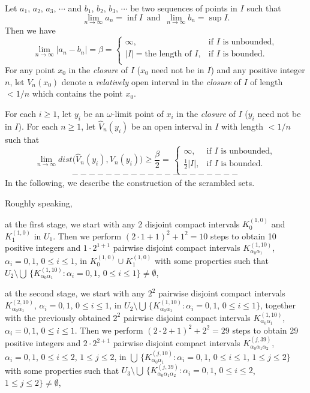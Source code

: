 \documentclass[12pt]{article}
\newcommand{\al}{\alpha}
\begin{document}
Let $a_1$, $a_2$, $a_3$, $\cdots$ and $b_1$, $b_2$, $b_3$, $\cdots$ be two sequences of points in $I$ such that
$$
\lim_{n \to \infty} a_n = \inf I \,\,\, \text{and} \,\,\, \lim_{n \to \infty} b_n = \sup I.
$$
Then we have
$$
\lim_{n \to \infty} |a_n - b_n| = \beta = \begin{cases}
         \infty, & \text{if $I$ is unbounded}, \\
         |I| = \text{the length of $I$}, & \text{if $I$ is bounded}. \\
         \end{cases}
$$ 
\indent For any point $x_0$ in the {\it closure} of $I$ ($x_0$ need not be in $I$) and any positive integer $n$, let $V_n(x_0)$ denote a {\it relatively} open interval in the {\it closure} of $I$ of length $< 1/n$ which contains the point $x_0$.
 
For each $i \ge 1$, let $y_i$ be an $\omega$-limit point of $x_i$ in the {\it closure} of $I$ ($y_i$ need not be in $I$).  For each $n \ge 1$, let $\widehat V_n(y_i)$ be an open interval in $I$ with length $< 1/n$ such that 
$$
\lim_{n \to \infty} dist\big(\widehat V_n(y_i), V_n(y_i)\big) \ge \frac \beta2 = \, \begin{cases}
                    \infty, & \text{if $I$ is unbounded}, \\
                    \frac 12|I|, & \text{if $I$ is bounded}. \\
                    \end{cases}
$$
$$--------------------$$
\indent In the following, we describe the construction of the scrambled sets.

Roughly speaking, 

at the first stage, we start with any 2 disjoint compact intervals $K_0^{(1,0)}$ and $K_1^{(1,0)}$ in $U_1$.  Then we perform $(2 \cdot 1 +1)^2 + 1^2 = 10$ steps to obtain 10 positive integers and $1 \cdot 2^{1+1}$ pairwise disjoint compact intervals $K_{\al_0\al_1}^{(1,10)}$, $\al_i = 0, 1$, $0 \le i \le 1$, in $K_0^{(1,0)} \cup K_1^{(1,0)}$ with some properties such that $U_2 \setminus \bigcup \, \{ K_{\al_0\al_1}^{(1,10)}: \al_i = 0, 1$, $0 \le i \le 1 \} \ne \emptyset$,  

at the second stage, we start with any $2^2$ pairwise disjoint compact intervals $K_{\al_0\al_1}^{(2,10)}$, $\al_i = 0, 1$, $0 \le i \le 1$, in $U_2 \setminus \bigcup \, \{ K_{\al_0\al_1}^{(1,10)}: \al_i = 0, 1$, $0 \le i \le 1 \}$, together with the previously obtained $2^2$ pairwise disjoint compact intervals $K_{\al_0\al_1}^{(1,10)}$, $\al_i = 0, 1$, $0 \le i \le 1$.  Then we perform $(2 \cdot 2 +1)^2 + 2^2 = 29$ steps to obtain 29 positive integers and $2 \cdot 2^{2+1}$ pairwise disjoint compact intervals $K_{\al_0\al_1\al_2}^{(j,39)}$, $\al_i = 0, 1$, $0 \le i \le 2$, $1 \le j \le 2$, in $\bigcup \, \{ K_{\al_0\al_1}^{(j,10)}: \al_i = 0,1$, $0 \le i \le 1$, $1 \le j \le 2 \}$ with some properties such that $U_3 \setminus \bigcup \, \{ K_{\al_0\al_1\al_2}^{(j,39)}: \al_i = 0, 1$, $0 \le i \le 2$, $1 \le j \le 2 \} \ne \emptyset$,
\end{document}
